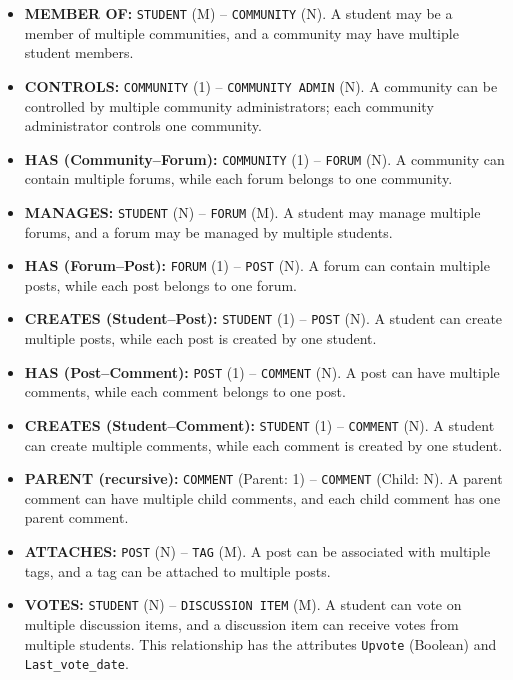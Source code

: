 \begin{itemize}
    \item \textbf{MEMBER OF:} \texttt{STUDENT} (M) -- \texttt{COMMUNITY} (N). A student may be a member of multiple communities, and a community may have multiple student members.

    \item \textbf{CONTROLS:} \texttt{COMMUNITY} (1) -- \texttt{COMMUNITY ADMIN} (N). A community can be controlled by multiple community administrators; each community administrator controls one community.

    \item \textbf{HAS (Community--Forum):} \texttt{COMMUNITY} (1) -- \texttt{FORUM} (N). A community can contain multiple forums, while each forum belongs to one community.

    \item \textbf{MANAGES:} \texttt{STUDENT} (N) -- \texttt{FORUM} (M). A student may manage multiple forums, and a forum may be managed by multiple students.

    \item \textbf{HAS (Forum--Post):} \texttt{FORUM} (1) -- \texttt{POST} (N). A forum can contain multiple posts, while each post belongs to one forum.

    \item \textbf{CREATES (Student--Post):} \texttt{STUDENT} (1) -- \texttt{POST} (N). A student can create multiple posts, while each post is created by one student.

    \item \textbf{HAS (Post--Comment):} \texttt{POST} (1) -- \texttt{COMMENT} (N). A post can have multiple comments, while each comment belongs to one post.

    \item \textbf{CREATES (Student--Comment):} \texttt{STUDENT} (1) -- \texttt{COMMENT} (N). A student can create multiple comments, while each comment is created by one student.

    \item \textbf{PARENT (recursive):} \texttt{COMMENT} (Parent: 1) -- \texttt{COMMENT} (Child: N). A parent comment can have multiple child comments, and each child comment has one parent comment.

    \item \textbf{ATTACHES:} \texttt{POST} (N) -- \texttt{TAG} (M). A post can be associated with multiple tags, and a tag can be attached to multiple posts.

    \item \textbf{VOTES:} \texttt{STUDENT} (N) -- \texttt{DISCUSSION ITEM} (M). A student can vote on multiple discussion items, and a discussion item can receive votes from multiple students. This relationship has the attributes \texttt{Upvote} (Boolean) and \texttt{Last\_vote\_date}.


\end{itemize}
